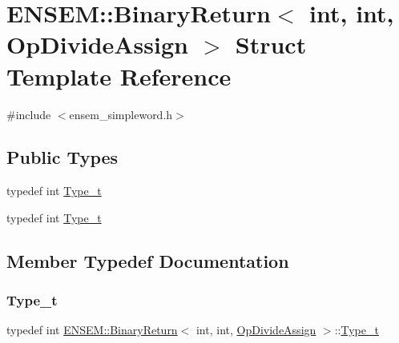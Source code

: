 \hypertarget{structENSEM_1_1BinaryReturn_3_01int_00_01int_00_01OpDivideAssign_01_4}{}\section{E\+N\+S\+EM\+:\+:Binary\+Return$<$ int, int, Op\+Divide\+Assign $>$ Struct Template Reference}
\label{structENSEM_1_1BinaryReturn_3_01int_00_01int_00_01OpDivideAssign_01_4}


{\ttfamily \#include $<$ensem\+\_\+simpleword.\+h$>$}

\subsection*{Public Types}
\begin{DoxyCompactItemize}
\item 
typedef int \mbox{\hyperlink{structENSEM_1_1BinaryReturn_3_01int_00_01int_00_01OpDivideAssign_01_4_a1d70852aadd3281d90240a0c36417d8b}{Type\+\_\+t}}
\item 
typedef int \mbox{\hyperlink{structENSEM_1_1BinaryReturn_3_01int_00_01int_00_01OpDivideAssign_01_4_a1d70852aadd3281d90240a0c36417d8b}{Type\+\_\+t}}
\end{DoxyCompactItemize}


\subsection{Member Typedef Documentation}
\mbox{\label{structENSEM_1_1BinaryReturn_3_01int_00_01int_00_01OpDivideAssign_01_4_a1d70852aadd3281d90240a0c36417d8b}} 
\subsubsection{\texorpdfstring{Type\_t}{Type\_t}\hspace{0.1cm}{\footnotesize\ttfamily [1/2]}}
{\footnotesize\ttfamily typedef int \mbox{\hyperlink{structENSEM_1_1BinaryReturn}{E\+N\+S\+E\+M\+::\+Binary\+Return}}$<$ int, int, \mbox{\hyperlink{structENSEM_1_1OpDivideAssign}{Op\+Divide\+Assign}} $>$\+::\mbox{\hyperlink{structENSEM_1_1BinaryReturn_3_01int_00_01int_00_01OpDivideAssign_01_4_a1d70852aadd3281d90240a0c36417d8b}{Type\+\_\+t}}}

